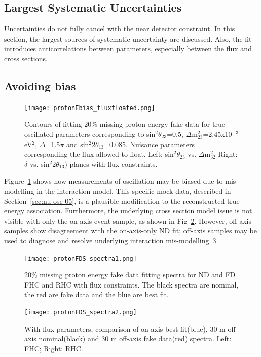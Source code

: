

\subsection{Largest Systematic Uncertainties}

Uncertainties do not fully cancel with the near detector constraint. In this section, the largest sources of systematic uncertainty are discussed. Also, the fit introduces anticorrelations between parameters, especially between the flux and cross sections.


\subsection{Avoiding bias}

\begin{figure}[h]
\centering
\texttt{[image: protonEbias\_fluxfloated.png]}
\caption{Contours of fitting 20\% missing proton energy fake data for true oscillated parameters corresponding to  sin$^{2}\theta_{23}$=0.5, $\Delta$m$^{2}_{23}$=2.45x10$^{-3}$ eV$^{2}$, $\Delta$=1.5$\pi$ and sin$^{2}2\theta_{13}$=0.085. Nuisance parameters corresponding the flux allowed to float.
Left: sin$^{2}\theta_{23}$ vs. $\Delta$m$^{2}_{32}$ Right: $\delta$ vs. sin$^{2}2\theta_{13}$) planes with flux constraints.} \label{protonFDSbias}
\end{figure}

Figure~\ref{protonFDSbias} shows how measurements of oscillation may be biased due to mis-modelling in the interaction model. This specific mock data, described in Section~\ref{sec:nu-osc-05}, is a plausible modification to the reconstructed-true energy association. Furthermore, the underlying cross section model issue is not visible with only the on-axis event sample, as shown in Fig~\ref{fig:protonFDS_spectra1}. However, off-axis samples show disagreement with the on-axis-only ND fit; off-axis samples may be used to diagnose and resolve underlying interaction mis-modelling~\ref{fig:protonFDS_spectra2}. %


\begin{figure}[h]
\centering
\texttt{[image: protonFDS\_spectra1.png]}
\caption{20\% missing proton energy fake data fitting spectra for ND and FD FHC and RHC with flux constraints. The black spectra are nominal, the red are fake data and the blue are best fit.}
\label{fig:protonFDS_spectra1}
\end{figure}

\begin{figure}[h]
\centering
\texttt{[image: protonFDS\_spectra2.png]}
\caption{With flux parameters, comparison of on-axis best fit(blue), 30 m off-axis nominal(black) and 30 m off-axis fake data(red) spectra. Left: FHC; Right: RHC. }
\label{fig:protonFDS_spectra2}
\end{figure}
